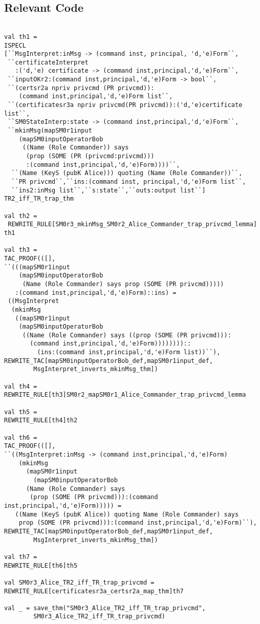 \documentclass{report}
\begin{document}
\subsection{Relevant Code}
\label{rel-code-8}
\begin{lstlisting}[frame=TBlr]

val th1 =
ISPECL
[``MsgInterpret:inMsg -> (command inst, principal, 'd,'e)Form``,
 ``certificateInterpret
   :('d,'e) certificate -> (command inst,principal,'d,'e)Form``,
 ``inputOKr2:(command inst,principal,'d,'e)Form -> bool``,
 ``(certsr2a npriv privcmd (PR privcmd)):
    (command inst,principal,'d,'e)Form list``,
 ``(certificatesr3a npriv privcmd(PR privcmd)):('d,'e)certificate list``,
 ``SM0StateInterp:state -> (command inst,principal,'d,'e)Form``,
 ``mkinMsg(mapSM0r1input
    (mapSM0inputOperatorBob
     ((Name (Role Commander)) says
      (prop (SOME (PR (privcmd:privcmd)))
      :(command inst,principal,'d,'e)Form))))``,
  ``(Name (KeyS (pubK Alice))) quoting (Name (Role Commander))``,
  ``PR privcmd``,``ins:(command inst, principal,'d,'e)Form list``,
  ``ins2:inMsg list``,``s:state``,``outs:output list``]
TR2_iff_TR_trap_thm

val th2 =
 REWRITE_RULE[SM0r3_mkinMsg_SM0r2_Alice_Commander_trap_privcmd_lemma] th1

val th3 =
TAC_PROOF(([],
``(((mapSM0r1input
    (mapSM0inputOperatorBob
     (Name (Role Commander) says prop (SOME (PR privcmd)))))
   :(command inst,principal,'d,'e)Form)::ins) =   
 ((MsgInterpret
  (mkinMsg
   ((mapSM0r1input
    (mapSM0inputOperatorBob
     ((Name (Role Commander) says ((prop (SOME (PR privcmd))):
       (command inst,principal,'d,'e)Form))))))))::
         (ins:(command inst,principal,'d,'e)Form list))``),
REWRITE_TAC[mapSM0inputOperatorBob_def,mapSM0r1input_def,
	    MsgInterpret_inverts_mkinMsg_thm])

val th4 =
REWRITE_RULE[th3]SM0r2_mapSM0r1_Alice_Commander_trap_privcmd_lemma

val th5 =
REWRITE_RULE[th4]th2

val th6 =
TAC_PROOF(([],
``((MsgInterpret:inMsg -> (command inst,principal,'d,'e)Form)
    (mkinMsg
      (mapSM0r1input
        (mapSM0inputOperatorBob
	  (Name (Role Commander) says
	   (prop (SOME (PR privcmd))):(command inst,principal,'d,'e)Form))))) =
   ((Name (KeyS (pubK Alice)) quoting Name (Role Commander) says
    prop (SOME (PR privcmd))):(command inst,principal,'d,'e)Form)``),
REWRITE_TAC[mapSM0inputOperatorBob_def,mapSM0r1input_def,
	    MsgInterpret_inverts_mkinMsg_thm])

val th7 =
REWRITE_RULE[th6]th5

val SM0r3_Alice_TR2_iff_TR_trap_privcmd =
REWRITE_RULE[certificatesr3a_certsr2a_map_thm]th7

val _ = save_thm("SM0r3_Alice_TR2_iff_TR_trap_privcmd",
        SM0r3_Alice_TR2_iff_TR_trap_privcmd)


\end{lstlisting}
\end{document}
